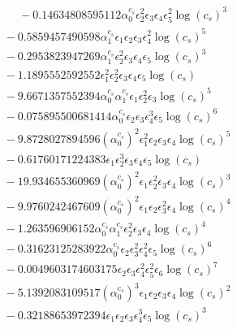 \documentclass[10pt]{article}
\begin{document}
\begin{align*}
\phantom{F_{s,7}} &\phantom{={}}{}  - 0.14634808595112 \alpha_{0}^{c_s} \epsilon_{2}^{2} \epsilon_{3} \epsilon_{4} \epsilon_{5}^{2} \log{\left(c_{s} \right)}^{3} \\
&{}  - 0.5859457490598 \alpha_{1}^{c_s} \epsilon_{1} \epsilon_{2} \epsilon_{3} \epsilon_{4}^{2} \log{\left(c_{s} \right)}^{5} \\
&{}  - 0.2953823947269 \alpha_{1}^{c_s} \epsilon_{2}^{2} \epsilon_{3} \epsilon_{4} \epsilon_{5} \log{\left(c_{s} \right)}^{3} \\
&{}  - 1.1895552592552 \epsilon_{1}^{2} \epsilon_{2}^{2} \epsilon_{3} \epsilon_{4} \epsilon_{5} \log{\left(c_{s} \right)} \\
&{}  - 9.6671357552394 \alpha_{0}^{c_s} \alpha_{1}^{c_s} \epsilon_{1} \epsilon_{2}^{2} \epsilon_{3} \log{\left(c_{s} \right)}^{5} \\
&{}  - 0.075895500681414 \alpha_{0}^{c_s} \epsilon_{2} \epsilon_{3} \epsilon_{4}^{3} \epsilon_{5} \log{\left(c_{s} \right)}^{6} \\
&{}  - 9.8728027894596 \left(\alpha_{0}^{c_s}\right)^{2} \epsilon_{1}^{2} \epsilon_{2} \epsilon_{3} \epsilon_{4} \log{\left(c_{s} \right)}^{5} \\
&{}  - 0.61760171224383 \epsilon_{1} \epsilon_{2}^{3} \epsilon_{3} \epsilon_{4} \epsilon_{5} \log{\left(c_{s} \right)} \\
&{}  - 19.934655360969 \left(\alpha_{0}^{c_s}\right)^{2} \epsilon_{1} \epsilon_{2}^{2} \epsilon_{3} \epsilon_{4} \log{\left(c_{s} \right)}^{3} \\
&{}  - 9.9760242467609 \left(\alpha_{0}^{c_s}\right)^{2} \epsilon_{1} \epsilon_{2} \epsilon_{3}^{2} \epsilon_{4} \log{\left(c_{s} \right)}^{4} \\
&{}  - 1.263596906152 \alpha_{0}^{c_s} \alpha_{1}^{c_s} \epsilon_{2}^{2} \epsilon_{3} \epsilon_{4} \log{\left(c_{s} \right)}^{4} \\
&{}  - 0.31623125283922 \alpha_{0}^{c_s} \epsilon_{2} \epsilon_{3}^{2} \epsilon_{4}^{2} \epsilon_{5} \log{\left(c_{s} \right)}^{6} \\
&{}  - 0.0049603174603175 \epsilon_{2} \epsilon_{3} \epsilon_{4}^{2} \epsilon_{5}^{2} \epsilon_{6} \log{\left(c_{s} \right)}^{7} \\
&{}  - 5.1392083109517 \left(\alpha_{0}^{c_s}\right)^{3} \epsilon_{1} \epsilon_{2} \epsilon_{3} \epsilon_{4} \log{\left(c_{s} \right)}^{2} \\
&{}  - 0.32188653972394 \epsilon_{1} \epsilon_{2} \epsilon_{3} \epsilon_{4}^{3} \epsilon_{5} \log{\left(c_{s} \right)}^{3} \\

\end{align*}
\end{document}
